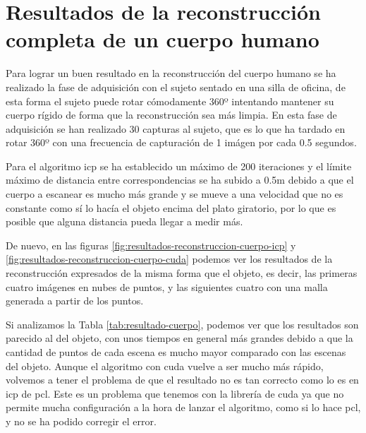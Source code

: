 \section{Resultados de la reconstrucción completa de un cuerpo humano}

Para lograr un buen resultado en la reconstrucción del cuerpo humano se ha realizado la fase de adquisición con el sujeto sentado en una silla de oficina, de esta forma el sujeto puede rotar cómodamente 360º intentando mantener su cuerpo rígido de forma que la reconstrucción sea más limpia.
En esta fase de adquisición se han realizado 30 capturas al sujeto, que es lo que ha tardado en rotar 360º con una frecuencia de capturación de 1 imágen por cada 0.5 segundos.

Para el algoritmo \gls{icp} se ha establecido un máximo de 200 iteraciones y el límite máximo de distancia entre correspondencias se ha subido a 0.5m debido a que el cuerpo a escanear es mucho más grande y se mueve a una velocidad que no es constante como sí lo hacía el objeto encima del plato giratorio, por lo que es posible que alguna distancia pueda llegar a medir más.

De nuevo, en las figuras \ref{fig:resultados-reconstruccion-cuerpo-icp} y \ref{fig:resultados-reconstruccion-cuerpo-cuda} podemos ver los resultados de la reconstrucción expresados de la misma forma que el objeto, es decir, las primeras cuatro imágenes en nubes de puntos, y las siguientes cuatro con una malla generada a partir de los puntos.

Si analizamos la Tabla \ref{tab:resultado-cuerpo}, podemos ver que los resultados son parecido al del objeto, con unos tiempos en general más grandes debido a que la cantidad de puntos de cada escena es mucho mayor comparado con las escenas del objeto.
Aunque el algoritmo con \gls{cuda} vuelve a ser mucho más rápido, volvemos a tener el problema de que el resultado no es tan correcto como lo es en \gls{icp} de \gls{pcl}.
Este es un problema que tenemos con la librería de \gls{cuda} ya que no permite mucha configuración a la hora de lanzar el algoritmo, como si lo hace \gls{pcl}, y no se ha podido corregir el error.

